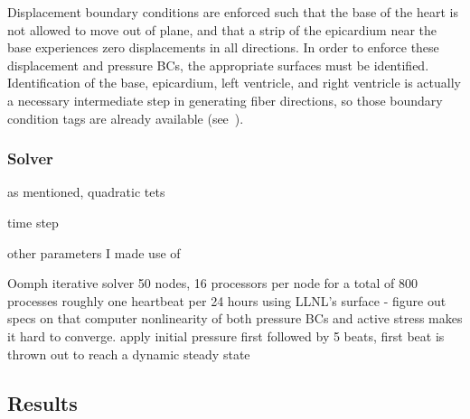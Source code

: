 Displacement boundary conditions are enforced such that the base of the heart is not allowed to move out of plane, and that a strip of the epicardium near the base experiences zero displacements in all directions. In order to enforce these displacement and pressure BCs, the appropriate surfaces must be identified. Identification of the base, epicardium, left ventricle, and right ventricle is actually a necessary intermediate step in generating fiber directions, so those boundary condition tags are already available (see~).

\subsubsection{Solver}
\label{Solver}

as mentioned, quadratic tets

time step

other parameters I made use of

Oomph
iterative solver
50 nodes, 16 processors per node for a total of 800 processes
roughly one heartbeat per 24 hours
using LLNL's surface - figure out specs on that computer
nonlinearity of both pressure BCs and active stress makes it hard to converge. apply initial pressure first
followed by 5 beats, first beat is thrown out to reach a dynamic steady state

\subsection{Results}
\label{Results}

